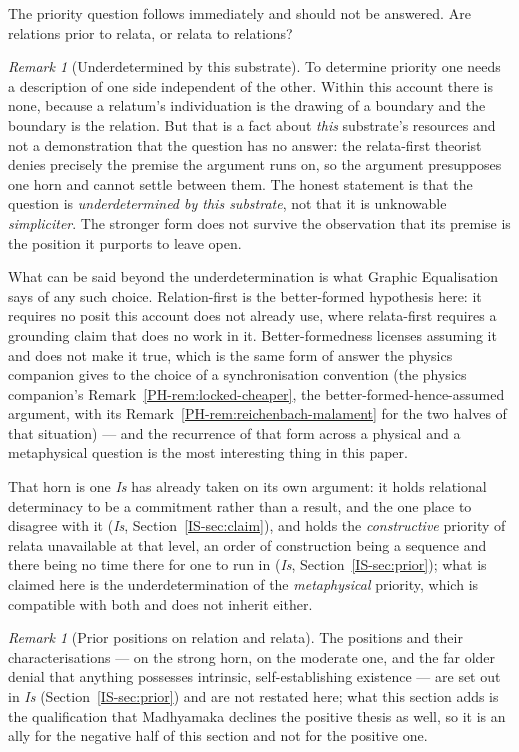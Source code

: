 \documentclass[11pt,a4paper]{article}
\theoremstyle{remark}\newtheorem{remark}[definition]{Remark}
\begin{document}
The priority question follows immediately and should not be answered. Are relations prior to relata,
or relata to relations?

\begin{remark}[Underdetermined by this substrate]\label{rem:underdetermined}
To determine priority one needs a description of one side independent of the other. Within this
account there is none, because a relatum's individuation is the drawing of a boundary and the
boundary is the relation. But that is a fact about \emph{this} substrate's resources and not a
demonstration that the question has no answer: the relata-first theorist denies precisely the premise
the argument runs on, so the argument presupposes one horn and cannot settle between them. The honest
statement is that the question is \emph{underdetermined by this substrate}, not that it is unknowable
\emph{simpliciter}. The stronger form does not survive the observation that its premise is the position it purports to leave open.
\end{remark}

What can be said beyond the underdetermination is what Graphic Equalisation says of any such choice.
Relation-first is the better-formed hypothesis here: it requires no posit this account does not
already use, where relata-first requires a grounding claim that does no work in it. Better-formedness
licenses assuming it and does not make it true, which is the same form of answer the physics
companion gives to the choice of a synchronisation convention (the physics companion's
Remark~\ref{PH-rem:locked-cheaper}, the better-formed-hence-assumed argument, with its
Remark~\ref{PH-rem:reichenbach-malament} for the two halves of that situation) --- and the recurrence
of that form across a physical and a metaphysical question is the most interesting thing in this
paper.

That horn is one \emph{Is} has already taken on its own argument: it holds relational determinacy to
be a commitment rather than a result, and the one place to disagree with it (\emph{Is},
Section~\ref{IS-sec:claim}), and holds the \emph{constructive} priority of relata unavailable at that
level, an order of construction being a sequence and there being no time there for one to run in
(\emph{Is}, Section~\ref{IS-sec:prior}); what is claimed here is the underdetermination of the
\emph{metaphysical} priority, which is compatible with both and does not inherit either.

\begin{remark}[Prior positions on relation and relata]\label{rem:relation-prior}
The positions and their characterisations --- \citet{ladymanross2007} on the strong horn,
\citet{esfeld2004} on the moderate one, and the far older denial that anything possesses intrinsic,
self-establishing existence \citep{nagarjuna1995} --- are set out in \emph{Is}
(Section~\ref{IS-sec:prior}) and are not restated here; what this section adds is the qualification
that Madhyamaka declines the positive thesis as well, so it is an ally for the negative half of this
section and not for the positive one.
\end{remark}
\end{document}

